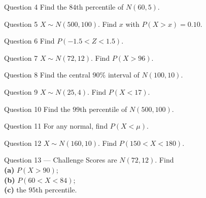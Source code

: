 \documentclass[11pt]{article}
\begin{document}
\begin{qbox}{Question 4}
Find the $84$th percentile of $N(60,5)$.\workspace{2.4cm}
\end{qbox}

\begin{qbox}{Question 5}
$X\sim N(500,100)$. Find $x$ with $P(X>x)=0.10$.\workspace{2.4cm}
\end{qbox}

\begin{qbox}{Question 6}
Find $P(-1.5<Z<1.5)$.\workspace{2.4cm}
\end{qbox}

\begin{qbox}{Question 7}
$X\sim N(72,12)$. Find $P(X>96)$.\workspace{2.4cm}
\end{qbox}

\begin{qbox}{Question 8}
Find the central $90\%$ interval of $N(100,10)$.\workspace{2.4cm}
\end{qbox}

\begin{qbox}{Question 9}
$X\sim N(25,4)$. Find $P(X<17)$.\workspace{2.4cm}
\end{qbox}

\begin{qbox}{Question 10}
Find the $99$th percentile of $N(500,100)$.\workspace{2.4cm}
\end{qbox}

\begin{qbox}{Question 11}
For any normal, find $P(X<\mu)$.\workspace{2.4cm}
\end{qbox}

\begin{qbox}{Question 12}
$X\sim N(160,10)$. Find $P(150<X<180)$.\workspace{2.4cm}
\end{qbox}

\begin{qbox}{Question 13 --- Challenge}
Scores are $N(72,12)$. Find \\ \textbf{(a)} $P(X>90)$; \\ \textbf{(b)} $P(60<X<84)$; \\ \textbf{(c)} the $95$th percentile.\workspace{3.4cm}
\end{qbox}

\clearpage
{}
\end{document}
